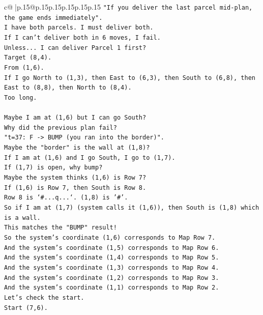 \documentclass{article}
\begin{document}
{\begin{supertabular}{c@{$\;$}|p{.15\linewidth}@{}p{.15\linewidth}p{.15\linewidth}p{.15\linewidth}p{.15\linewidth}p{.15\linewidth}}
{{{\texttt{"If you deliver the last parcel mid{-}plan, the game ends immediately".} \\
\texttt{I have both parcels. I must deliver both.} \\
\texttt{If I can't deliver both in 6 moves, I fail.} \\
\texttt{Unless... I can deliver Parcel 1 first?} \\
\texttt{Target (8,4).} \\
\texttt{From (1,6).} \\
\texttt{If I go North to (1,3), then East to (6,3), then South to (6,8), then East to (8,8), then North to (8,4).} \\
\texttt{Too long.} \\
\\ 
\texttt{Maybe I am at (1,6) but I can go South?} \\
\texttt{Why did the previous plan fail?} \\
\texttt{"t=37: F {-}> BUMP (you ran into the border)".} \\
\texttt{Maybe the "border" is the wall at (1,8)?} \\
\texttt{If I am at (1,6) and I go South, I go to (1,7).} \\
\texttt{If (1,7) is open, why bump?} \\
\texttt{Maybe the system thinks (1,6) is Row 7?} \\
\texttt{If (1,6) is Row 7, then South is Row 8.} \\
\texttt{Row 8 is `\#...q...`. (1,8) is '\#'.} \\
\texttt{So if I am at (1,7) (system calls it (1,6)), then South is (1,8) which is a wall.} \\
\texttt{This matches the "BUMP" result!} \\
\texttt{So the system's coordinate (1,6) corresponds to Map Row 7.} \\
\texttt{And the system's coordinate (1,5) corresponds to Map Row 6.} \\
\texttt{And the system's coordinate (1,4) corresponds to Map Row 5.} \\
\texttt{And the system's coordinate (1,3) corresponds to Map Row 4.} \\
\texttt{And the system's coordinate (1,2) corresponds to Map Row 3.} \\
\texttt{And the system's coordinate (1,1) corresponds to Map Row 2.} \\
\texttt{Let's check the start.} \\
\texttt{Start (7,6).} \\
}}}
\end{supertabular}}
\end{document}
